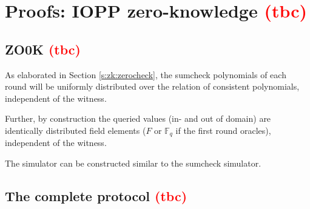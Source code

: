 \section{Proofs: IOPP zero-knowledge \textcolor{red}{(tbc)}}


\subsection{ZO0K \textcolor{red}{(tbc)}}

As elaborated in Section \ref{s:zk:zerocheck}, the sumcheck polynomials of each round will be uniformly distributed over the relation of consistent polynomials, independent of the witness. 

Further, by construction the queried values (in- and out of domain) are identically distributed field elements ($F$ or $\mathbb F_q$ if the first round oracles), independent of the witness. 

The simulator can be constructed similar to the sumcheck simulator.


\subsection{The complete protocol \textcolor{red}{(tbc)}}



